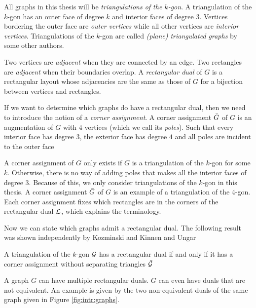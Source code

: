   All graphs in this thesis will be \emph{triangulations of the $k$-gon}. A triangulation of the $k$-gon has an outer face of degree $k$ and interior faces of degree $3$.
  Vertices bordering the outer face are \emph{outer vertices} while all other vertices are \emph{interior vertices}.
  Triangulations of the $k$-gon are called \emph{(plane) triangulated graphs} by some other authors.

  Two vertices are \emph{adjacent} when they are connected by an edge. Two rectangles are \emph{adjacent} when their boundaries overlap. A \emph{rectangular dual} of $G$ is a rectangular layout whose adjacencies are the same as those of $G$ for a bijection between vertices and rectangles.

  If we want to determine which graphs do have a rectangular dual, then we need to introduce the notion of a \emph{corner assignment}.
  A corner assignment $\bar{G}$ of $G$ is an augmentation of $G$ with $4$ vertices (which we call its \emph{poles}). Such that every interior face has degree $3$, the exterior face has degree $4$ and all poles are incident to the outer face

  A corner assignment of $G$ only exists if $G$ is a triangulation of the $k$-gon for some $k$. Otherwise, there is no way of adding poles that makes all the interior faces of degree $3$. Because of this, we only consider triangulations of the $k$-gon in this thesis. A corner assignment $\bar{G}$ of $G$ is an example of a triangulation of the $4$-gon. Each corner assignment fixes which rectangles are in the corners of the rectangular dual $\mathcal{L}$, which explains the terminology.


  Now we can state which graphs admit a rectangular dual. The following result was shown independently by Kozminski and Kinnen \cite{Kozminski1984} and Ungar \cite{Ungar1953}

  \begin{thrm}
    \label{th:rect:exsitenceREctangularDual}
    A triangulation of the $k$-gon $\mathcal{G}$ has a rectangular dual if and only if it has a corner assignment without separating triangles $\bar{\mathcal{G}}$
  \end{thrm}

  A graph $G$ can have multiple rectangular duals. $G$ can even have duals that are not equivalent. An example is given by the two non-equivalent duals of the same graph given in Figure \ref{fig:intr:graphs}.

